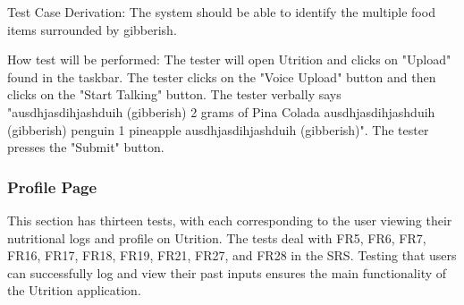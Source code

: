 \documentclass[12pt, titlepage]{article}
\begin{document}
\begin{enumerate}
	Test Case Derivation: The system should be able to identify the multiple food items surrounded by gibberish.
	
	How test will be performed: The tester will open Utrition and clicks on "Upload" found in the taskbar. The tester clicks on the "Voice Upload" button and then clicks on the "Start Talking" button. The tester verbally says "ausdhjasdihjashduih (gibberish) 2 grams of Pina Colada ausdhjasdihjashduih (gibberish) penguin 1 pineapple ausdhjasdihjashduih (gibberish)". The tester presses the "Submit" button.
	
\end{enumerate}
	
	\subsubsection{Profile Page}
	This section has thirteen tests, with each corresponding to the user viewing their nutritional logs and profile on Utrition. The tests deal with FR5, FR6, FR7, FR16, FR17, FR18, FR19, FR21, FR27, and FR28 in the SRS. Testing that users can successfully log and view their past inputs ensures the main functionality of the Utrition application.
	
\end{document}
